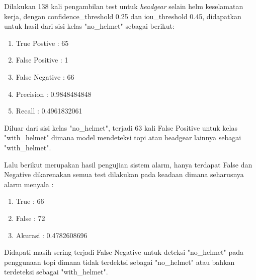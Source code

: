 Dilakukan 138 kali pengambilan test untuk \emph{headgear} selain helm keselamatan kerja, dengan confidence\_threshold 0.25 dan iou\_threshold 0.45, didapatkan untuk hasil dari sisi kelas "no\_helmet" sebagai berikut:

\begin{enumerate}[nolistsep]
  \item True Postive : 65
  \item False Positive : 1
  \item False Negative : 66
  \item Precision : 0.9848484848
  \item Recall : 0.4961832061
\end{enumerate}

Diluar dari sisi kelas "no\_helmet", terjadi 63 kali False Positive untuk kelas "with\_helmet" dimana model mendeteksi topi atau headgear lainnya sebagai "with\_helmet".

Lalu berikut merupakan hasil pengujian sistem alarm, hanya terdapat False dan Negative dikarenakan semua test dilakukan pada keadaan dimana seharusnya alarm menyala :

\begin{enumerate}[nolistsep]
  \item True : 66
  \item False : 72
  \item Akurasi : 0.4782608696
\end{enumerate}

Didapati masih sering terjadi False Negative untuk deteksi "no\_helmet" pada penggunaan topi dimana tidak terdektsi sebagai "no\_helmet" atau bahkan terdeteksi sebagai "with\_helmet".

